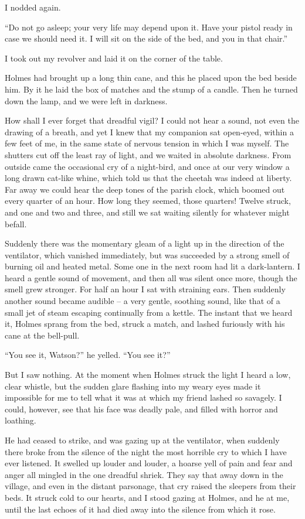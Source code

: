 I nodded again.

“Do not go asleep; your very life may depend upon it.
Have your pistol ready in case we should need it. I will sit
on the side of the bed, and you in that chair.”

I took out my revolver and laid it on the corner of the table.

Holmes had brought up a long thin cane, and this he
placed upon the bed beside him. By it he laid the box of
matches and the stump of a candle. Then he turned down
the lamp, and we were left in darkness.

How shall I ever forget that dreadful vigil? I could not
hear a sound, not even the drawing of a breath, and yet I
knew that my companion sat open-eyed, within a few feet of
me, in the same state of nervous tension in which I was myself.
The shutters cut off the least ray of light, and we
waited in absolute darkness. From outside came the occasional
cry of a night-bird, and once at our very window a long
drawn cat-like whine, which told us that the cheetah was indeed
at liberty. Far away we could hear the deep tones of
the parish clock, which boomed out every quarter of an hour.
How long they seemed, those quarters! Twelve struck, and
one and two and three, and still we sat waiting silently for
whatever might befall.

Suddenly there was the momentary gleam of a light up in
the direction of the ventilator, which vanished immediately,
but was succeeded by a strong smell of burning oil and heated
metal. Some one in the next room had lit a dark-lantern.
I heard a gentle sound of movement, and then all was silent
once more, though the smell grew stronger. For half an hour
I sat with straining ears. Then suddenly another sound became
audible -- a very gentle, soothing sound, like that of a
small jet of steam escaping continually from a kettle. The
instant that we heard it, Holmes sprang from the bed, struck
a match, and lashed furiously with his cane at the bell-pull.

“You see it, Watson?” he yelled. “You see it?”

But I saw nothing. At the moment when Holmes struck
the light I heard a low, clear whistle, but the sudden glare
flashing into my weary eyes made it impossible for me to tell
what it was at which my friend lashed so savagely. I could,
however, see that his face was deadly pale, and filled with
horror and loathing.

He had ceased to strike, and was gazing up at the ventilator,
when suddenly there broke from the silence of the night
the most horrible cry to which I have ever listened. It
swelled up louder and louder, a hoarse yell of pain and fear
and anger all mingled in the one dreadful shriek. They say
that away down in the village, and even in the distant parsonage,
that cry raised the sleepers from their beds. It struck
cold to our hearts, and I stood gazing at Holmes, and he at
me, until the last echoes of it had died away into the silence
from which it rose.

